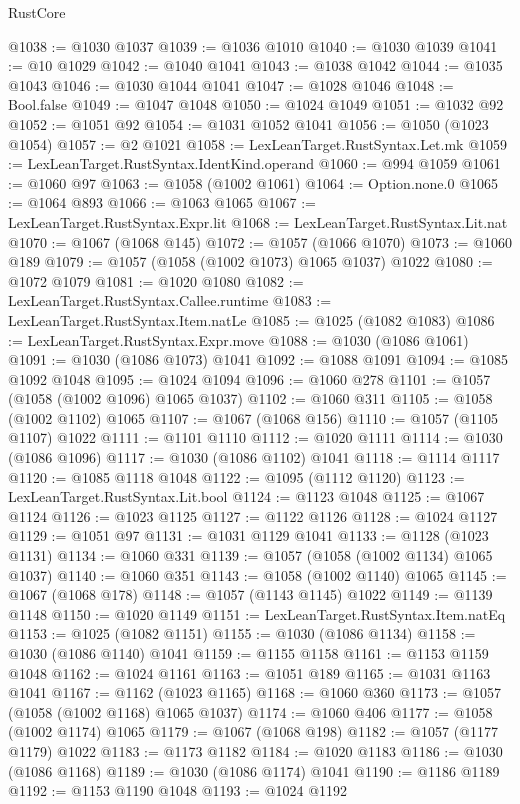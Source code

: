 \begin{lexlean}{RustCore}
\begin{coremodule}
@1038 := @1030 @1037
@1039 := @1036 @1010
@1040 := @1030 @1039
@1041 := @10 @1029
@1042 := @1040 @1041
@1043 := @1038 @1042
@1044 := @1035 @1043
@1046 := @1030 @1044 @1041
@1047 := @1028 @1046
@1048 := Bool.false
@1049 := @1047 @1048
@1050 := @1024 @1049
@1051 := @1032 @92
@1052 := @1051 @92
@1054 := @1031 @1052 @1041
@1056 := @1050 (@1023 @1054)
@1057 := @2 @1021
@1058 := LexLeanTarget.RustSyntax.Let.mk
@1059 := LexLeanTarget.RustSyntax.IdentKind.operand
@1060 := @994 @1059
@1061 := @1060 @97
@1063 := @1058 (@1002 @1061)
@1064 := Option.none.{0}
@1065 := @1064 @893
@1066 := @1063 @1065
@1067 := LexLeanTarget.RustSyntax.Expr.lit
@1068 := LexLeanTarget.RustSyntax.Lit.nat
@1070 := @1067 (@1068 @145)
@1072 := @1057 (@1066 @1070)
@1073 := @1060 @189
@1079 := @1057 (@1058 (@1002 @1073) @1065 @1037) @1022
@1080 := @1072 @1079
@1081 := @1020 @1080
@1082 := LexLeanTarget.RustSyntax.Callee.runtime
@1083 := LexLeanTarget.RustSyntax.Item.natLe
@1085 := @1025 (@1082 @1083)
@1086 := LexLeanTarget.RustSyntax.Expr.move
@1088 := @1030 (@1086 @1061)
@1091 := @1030 (@1086 @1073) @1041
@1092 := @1088 @1091
@1094 := @1085 @1092 @1048
@1095 := @1024 @1094
@1096 := @1060 @278
@1101 := @1057 (@1058 (@1002 @1096) @1065 @1037)
@1102 := @1060 @311
@1105 := @1058 (@1002 @1102) @1065
@1107 := @1067 (@1068 @156)
@1110 := @1057 (@1105 @1107) @1022
@1111 := @1101 @1110
@1112 := @1020 @1111
@1114 := @1030 (@1086 @1096)
@1117 := @1030 (@1086 @1102) @1041
@1118 := @1114 @1117
@1120 := @1085 @1118 @1048
@1122 := @1095 (@1112 @1120)
@1123 := LexLeanTarget.RustSyntax.Lit.bool
@1124 := @1123 @1048
@1125 := @1067 @1124
@1126 := @1023 @1125
@1127 := @1122 @1126
@1128 := @1024 @1127
@1129 := @1051 @97
@1131 := @1031 @1129 @1041
@1133 := @1128 (@1023 @1131)
@1134 := @1060 @331
@1139 := @1057 (@1058 (@1002 @1134) @1065 @1037)
@1140 := @1060 @351
@1143 := @1058 (@1002 @1140) @1065
@1145 := @1067 (@1068 @178)
@1148 := @1057 (@1143 @1145) @1022
@1149 := @1139 @1148
@1150 := @1020 @1149
@1151 := LexLeanTarget.RustSyntax.Item.natEq
@1153 := @1025 (@1082 @1151)
@1155 := @1030 (@1086 @1134)
@1158 := @1030 (@1086 @1140) @1041
@1159 := @1155 @1158
@1161 := @1153 @1159 @1048
@1162 := @1024 @1161
@1163 := @1051 @189
@1165 := @1031 @1163 @1041
@1167 := @1162 (@1023 @1165)
@1168 := @1060 @360
@1173 := @1057 (@1058 (@1002 @1168) @1065 @1037)
@1174 := @1060 @406
@1177 := @1058 (@1002 @1174) @1065
@1179 := @1067 (@1068 @198)
@1182 := @1057 (@1177 @1179) @1022
@1183 := @1173 @1182
@1184 := @1020 @1183
@1186 := @1030 (@1086 @1168)
@1189 := @1030 (@1086 @1174) @1041
@1190 := @1186 @1189
@1192 := @1153 @1190 @1048
@1193 := @1024 @1192

\end{coremodule}
\end{lexlean}
